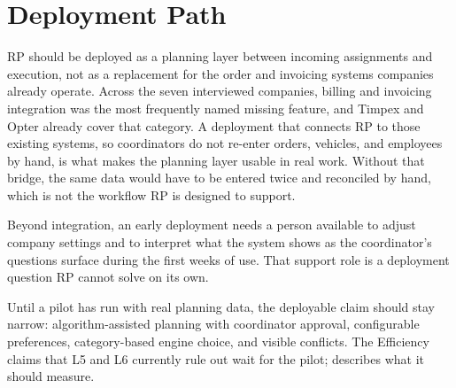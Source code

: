 \section{Deployment Path}
\label{sec:adoption}
\label{sec:recommendations}

RP should be deployed as a planning layer between incoming assignments and execution, not as a replacement for the order and invoicing systems companies already operate. Across the seven interviewed companies, billing and invoicing integration was the most frequently named missing feature, and Timpex and Opter already cover that category. A deployment that connects RP to those existing systems, so coordinators do not re-enter orders, vehicles, and employees by hand, is what makes the planning layer usable in real work. Without that bridge, the same data would have to be entered twice and reconciled by hand, which is not the workflow RP is designed to support.

Beyond integration, an early deployment needs a person available to adjust company settings and to interpret what the system shows as the coordinator's questions surface during the first weeks of use. That support role is a deployment question RP cannot solve on its own.

Until a pilot has run with real planning data, the deployable claim should stay narrow: algorithm-assisted planning with coordinator approval, configurable preferences, category-based engine choice, and visible conflicts. The Efficiency claims that L5 and L6 currently rule out wait for the pilot;  describes what it should measure.
